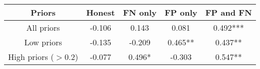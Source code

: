 \begin{table}[H]\centering \begin{tabular}{ccccc} \hline \hline
\textbf{Priors}&\textbf{Honest}&\textbf{FN only}& \textbf{FP only} & \textbf{FP and FN}\\ \hline
All priors&-0.106&0.143&0.081&0.492***\\
Low priors&-0.135&-0.209&0.465**&0.437**\\
High priors ($>$0.2)&-0.077&0.496*&-0.303&0.547**\\
\hline \end{tabular} \end{table}
